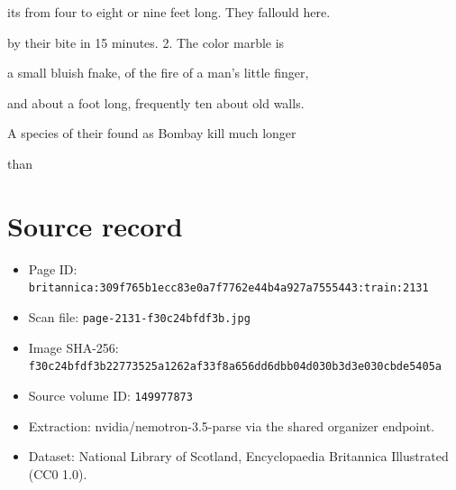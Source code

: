 \documentclass{article}
\begin{document}
its from four to eight or nine feet long. They fallould here.

by their bite in 15 minutes. 2. The color marble is

a small bluish fnake, of the fire of a man's little finger,

and about a foot long, frequently ten about old walls.

A species of their found as Bombay kill much longer

than

\section*{Source record}
\begin{itemize}
\item Page ID: \texttt{britannica:309f765b1ecc83e0a7f7762e44b4a927a7555443:train:2131}
\item Scan file: \texttt{page-2131-f30c24bfdf3b.jpg}
\item Image SHA-256: \texttt{f30c24bfdf3b22773525a1262af33f8a656dd6dbb04d030b3d3e030cbde5405a}
\item Source volume ID: \texttt{149977873}
\item Extraction: nvidia/nemotron-3.5-parse via the shared organizer endpoint.
\item Dataset: National Library of Scotland, Encyclopaedia Britannica Illustrated (CC0 1.0).
\end{itemize}
\end{document}
